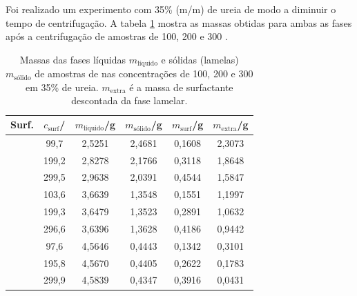 	Foi realizado um experimento com 35\% (m/m) de ureia de modo a diminuir o tempo de centrifugação. A tabela \ref{tab:SAXS_centrifug_ur35} mostra as massas obtidas para ambas as fases após a centrifugação de amostras de \CTDTAB{} 100, 200 e 300 \mM{}.
	
	\begin{table}[h]
		\IBGEtab%
		{
			\caption{Massas das fases líquidas \(m_{\text{líquido}}\) e sólidas (lamelas) \(m_{\text{sólido}}\) de amostras de \CTDTAB{} nas concentrações de 100, 200 e 300 \mM{} em 35\% de ureia. \(m_{\text{extra}}\) é a massa de surfactante descontada da fase lamelar.}
			
			\label{tab:SAXS_centrifug_ur35}
		}
		{
			\begin{tabular}{c c | c c c c}
				\toprule
				        Surf.         & \(c_{\text{surf}}\)/\mM & \(m_{\text{líquido}}\)/g & \(m_{\text{sólido}}\)/g & \(m_{\text{surf}}\)/g & \(m_{\text{extra}}\)/g \\ \midrule
				\multirow{3}{*}{\CTAB} & 99,7                  & 2,5251                 & 2,4681                & 0,1608              & 2,3073               \\
				                      & 199,2                 & 2,8278                 & 2,1766                & 0,3118              & 1,8648               \\
				                      & 299,5                 & 2,9638                 & 2,0391                & 0,4544              & 1,5847               \\ \midrule
				\multirow{3}{*}{\TTAB} & 103,6                 & 3,6639                 & 1,3548                & 0,1551              & 1,1997               \\
				                      & 199,3                 & 3,6479                 & 1,3523                & 0,2891              & 1,0632               \\
				                      & 296,6                 & 3,6396                 & 1,3628                & 0,4186              & 0,9442               \\ \midrule
				\multirow{3}{*}{\DTAB} & 97,6                  & 4,5646                 & 0,4443                & 0,1342              & 0,3101               \\
				                      & 195,8                 & 4,5670                 & 0,4405                & 0,2622              & 0,1783               \\
				                      & 299,9                 & 4,5839                 & 0,4347                & 0,3916              & 0,0431               \\ \bottomrule
			\end{tabular}
		}
		{}
	\end{table}
	

